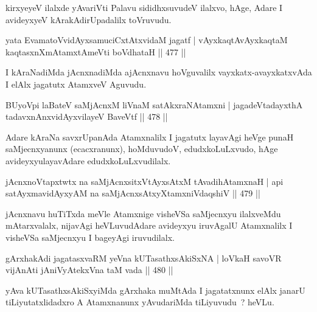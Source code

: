 \begin{artha}
kirxyeyeV ilalxde yAvariVti Palavu sididhxsuvudeV ilalxvo, hAge, Adare I avideyxyeV kArakAdirUpadalilx toVruvudu.
\end{artha}

\begin{shl}
yata EvamatoV\s vidAyxsamuciCxtAtxvidaM jagatf |
vAyxkaqtAvAyxkaqtaM kaqtasxnXmAtamxtAmeVti boVdhataH \hfill || 477 ||
\end{shl}

\begin{artha}
I kAraNadiMda jAcnxnadiMda ajAcnxnavu hoVguvalilx vayxkatx-avayxkatxvAda I elAlx jagatutx AtamxveV Aguvudu.
\end{artha}

\begin{shl}
BUyoV\s pi laBateV saMjAcnxM liVnaM satAkxraNAtamxni |
jagadeVtadayxthA tadavxnAnxvidAyxvilayeV BaveVtf \hfill || 478 ||
\end{shl}

\begin{artha}
Adare kAraNa savxrUpanAda Atamxnalilx I jagatutx layavAgi heVge punaH saMjecnxyanunx (ecacxranunx), hoMduvudoV, edudxkoLuLxvudo, hAge avideyxyulayavAdare edudxkoLuLxvudilalx.
\end{artha}

\begin{shl}
jAcnxnoVtapxtwtx na saMjAcnx\s sitxVtAyxsAtxM tAvadihA\s \s tamxnaH |
api satAyxmavidAyxyAM na saMjAcnx\s sAtxyXtamxniVdaqshiV \hfill || 479 ||
\end{shl}

\begin{artha}
jAcnxnavu huTiTxda meVle Atamxnige visheVSa saMjecnxyu ilalxveMdu mAtarxvalalx, nijavAgi heVLuvudAdare avideyxyu iruvAgalU Atamxnalilx I visheVSa saMjecnxyu I bageyAgi iruvudilalx.
\end{artha}

\begin{shl}
gArxhakAdi jagatasxvaRM yeVna kUTasathxsAkiSxNA |
loVkaH savoVR vijAnAti jAniVyAtekxVna taM vada \hfill || 480 ||
\end{shl}

\begin{artha}
yAva kUTasathxsAkiSxyiMda gArxhaka muMtAda I jagatatxnunx elAlx janarU
tiLiyutatxlidadxro A Atamxnanunx yAvudariMda tiLiyuvudu~? heVLu.
\end{artha}


